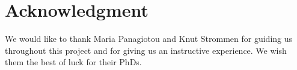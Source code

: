 
\section{Acknowledgment}
We would like to thank Maria Panagiotou and Knut Strommen for guiding us throughout this project and for giving us an instructive experience. We wish them the best of luck for their PhDs.
